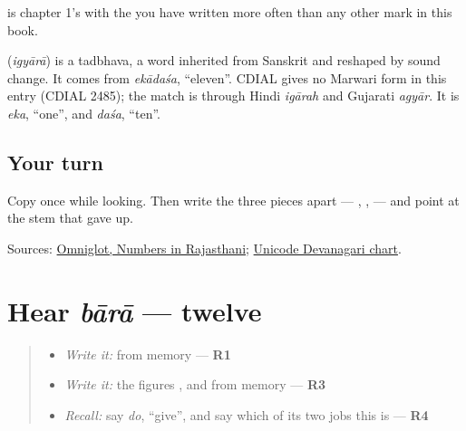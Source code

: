 \textbf{} is chapter 1's \textbf{} with the \textbf{} you have written more often than any other mark in this book.

\begin{cousinweb}
\textbf{} (\emph{igyārā}) is a tadbhava, a word inherited from Sanskrit and reshaped by sound change. It comes from \emph{ekādaśa}, \textquotedblleft{}eleven\textquotedblright{}. CDIAL gives no Marwari form in this entry (CDIAL 2485); the match is through Hindi \emph{igārah} and Gujarati \emph{agyār}. It is \emph{eka}, \textquotedblleft{}one\textquotedblright{}, and \emph{daśa}, \textquotedblleft{}ten\textquotedblright{}.
\end{cousinweb}

\subsection*{Your turn}
Copy \textbf{} once while looking. Then write the three pieces apart — \textbf{}, \textbf{}, \textbf{} — and point at the stem that \textbf{} gave up.

\begin{tcolorbox}[breakable,colback=teal!4,colframe=teal!35!black,title={Before you move on}]
Sources: \href{https://www.omniglot.com/language/numbers/rajasthani.htm}{Omniglot, Numbers in Rajasthani}; \href{https://www.unicode.org/charts/PDF/U0900.pdf}{Unicode Devanagari chart}.
\end{tcolorbox}
\section[bārā]{Hear \emph{bārā} — twelve}

\label{lesson:MW-C37-hear-baara}



\begin{quote}
\begin{itemize}
\raggedright
  \item \emph{Write it:} \textbf{} from memory — \textbf{R1}
  \item \emph{Write it:} the figures \textbf{}, \textbf{} and \textbf{} from memory — \textbf{R3}
  \item \emph{Recall:} say \emph{do}, \textquotedblleft{}give\textquotedblright{}, and say which of its two jobs this is — \textbf{R4}
\end{itemize}
\end{quote}

